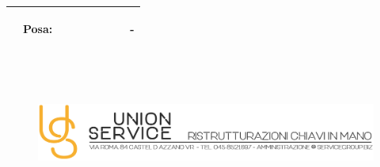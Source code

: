 \documentclass[a4paper]{article}
\begin{document}
\begin{tabular}{ | L{6.1mm} |  L{52.4mm} |  L{7mm} | L{7mm} | L{7mm} | L{7mm} | L{8mm} | L{8mm} | L{16mm} |   }
                        \vspace{2.5mm}\begin{spacing}{0}\end{spacing} &\vspace{2.5mm}\begin{spacing}{0}Posa:\end{spacing} &\vspace{2.5mm}\begin{spacing}{0}\end{spacing} &\vspace{2.5mm}\begin{spacing}{0}\end{spacing} &\vspace{2.5mm}\begin{spacing}{0}\end{spacing} &\vspace{2.5mm}\begin{spacing}{0}\end{spacing} &\vspace{2.5mm}\begin{spacing}{0}\end{spacing} &\vspace{2.5mm}\begin{spacing}{0}\end{spacing} &\vspace{2.5mm}\begin{spacing}{0}-
                        \end{spacing} \\ \hline %

                        \end{tabular} \\ \newpage
                                \begin{figure}[!t]
                                \includegraphics[width=15.8cm, height=3cm]{intestazioneAlta2.jpg}
                                \end{figure}
                                
\end{document}
